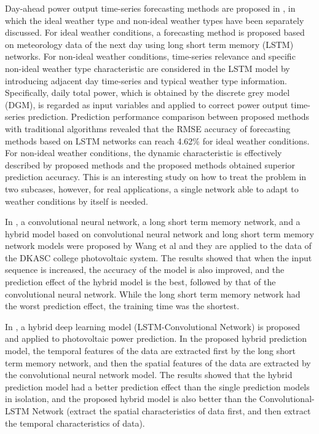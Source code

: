 Day-ahead power output time-series forecasting methods are proposed in \cite{GAO2019115838}, in which the ideal weather type and non-ideal weather types have been separately discussed.
For ideal weather conditions, a forecasting method is proposed based on meteorology data of the next day using long short term memory (LSTM) networks.
For non-ideal weather conditions, time-series relevance and specific non-ideal weather type characteristic are considered in the LSTM model by introducing adjacent day time-series and typical weather type information.
Specifically, daily total power, which is obtained by the discrete grey model (DGM), is regarded as input variables and applied to correct power output time-series prediction.
Prediction performance comparison between proposed methods with traditional algorithms revealed that the RMSE accuracy of forecasting methods based on LSTM networks can reach 4.62\% for ideal weather conditions.
For non-ideal weather conditions, the dynamic characteristic is effectively described by proposed methods and the proposed methods obtained superior prediction accuracy.
This is an interesting study on how to treat the problem in two subcases, however,  for real applications, a single network able to adapt to weather conditions by itself is needed.

In \cite{WANG2019113315}, a convolutional neural network, a long short term memory network, and a hybrid model based on convolutional neural network and long short term memory network models were proposed by Wang et al and they are applied to the data of the DKASC college photovoltaic system.
The results showed that when the input sequence is increased, the accuracy of the model is also improved, and the prediction effect of the hybrid model is the best, followed by that of the convolutional neural network.
While the long short term memory network had the worst prediction effect, the training time was the shortest.

In \cite{WANG2019116225}, a hybrid deep learning model (LSTM-Convolutional Network) is proposed and applied to photovoltaic power prediction.
In the proposed hybrid prediction model, the temporal features of the data are extracted first by the long short term memory network, and then the spatial features of the data are extracted by the convolutional neural network model.
The results showed that the hybrid prediction model had a better prediction effect than the single prediction models in isolation, and the proposed hybrid model is also better than the Convolutional-LSTM Network (extract the spatial characteristics of data first, and then extract the temporal characteristics of data).

